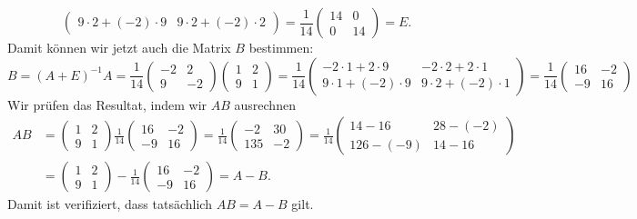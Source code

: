 \begin{loesung}
\[\begin{pmatrix}
 9\cdot 2 + (-2)\cdot 9 &  9 \cdot 2 +(-2) \cdot 2
\end{pmatrix}
=
\frac1{14}
\begin{pmatrix}
14& 0\\
 0&14
\end{pmatrix}
=E.
\]
Damit können wir jetzt auch die Matrix $B$ bestimmen:
\[
B=(A+E)^{-1}A
=
\frac1{14}
\begin{pmatrix}
-2& 2\\
 9&-2
\end{pmatrix}
\begin{pmatrix}
1&2\\
9&1
\end{pmatrix}
=
\frac1{14}
\begin{pmatrix}
-2 \cdot 1 +   2  \cdot 9 & -2 \cdot 2 +   2  \cdot 1 \\
 9 \cdot 1 + (-2) \cdot 9 &  9 \cdot 2 + (-2) \cdot 1
\end{pmatrix}
=
\frac1{14}
\begin{pmatrix}
16& -2\\
-9&16
\end{pmatrix}
\]
Wir prüfen das Resultat, indem wir $AB$ ausrechnen
\begin{align*}
AB&=
\begin{pmatrix}
1&2\\
9&1
\end{pmatrix}
\frac1{14}
\begin{pmatrix}
16& -2\\
-9& 16
\end{pmatrix}
=
\frac1{14}
\begin{pmatrix}
 -2&30\\
135&-2
\end{pmatrix}
=
\frac1{14}
\begin{pmatrix}
 14 -  16 &28 -(-2)\\
126 - (-9)&14 - 16
\end{pmatrix}
\\
&=
\begin{pmatrix}
 1 & 2\\
 9 & 1
\end{pmatrix}
-
\frac1{14}
\begin{pmatrix}
16& -2\\
-9& 16
\end{pmatrix}
=
A-B.
\end{align*}
Damit ist verifiziert, dass tatsächlich $AB=A-B$ gilt.
\end{loesung}

